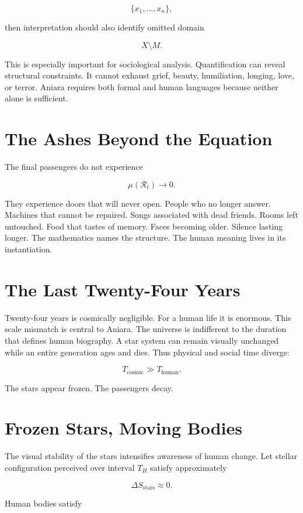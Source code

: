 \documentclass[11pt,oneside]{book}
\theoremstyle{definition}
\theoremstyle{remark}
\newcommand{\R}{\mathcal{R}}
\begin{document}
\[
\{x_1,\ldots,x_n\},
\]

then interpretation should also identify omitted domain

\[
X\setminus M.
\]

This is especially important for sociological analysis. Quantification can reveal structural
constraints. It cannot exhaust grief, beauty, humiliation, longing, love, or terror. Aniara requires
both formal and human languages because neither alone is sufficient.

\section{The Ashes Beyond the Equation}

The final passengers do not experience

\[
\mu(\R_t)\rightarrow0.
\]

They experience doors that will never open. People who no longer answer. Machines that cannot be
repaired. Songs associated with dead friends. Rooms left untouched. Food that tastes of memory.
Faces becoming older. Silence lasting longer. The mathematics names the structure. The human meaning
lives in its instantiation.

\section{The Last Twenty-Four Years}

Twenty-four years is cosmically negligible. For a human life it is enormous. This scale mismatch is
central to Aniara. The universe is indifferent to the duration that defines human biography. A star
system can remain visually unchanged while an entire generation ages and dies. Thus physical and
social time diverge:

\[
T_{\mathrm{cosmic}} \gg T_{\mathrm{human}}.
\]

The stars appear frozen. The passengers decay.

\section{Frozen Stars, Moving Bodies}

The visual stability of the stars intensifies awareness of human change. Let stellar configuration
perceived over interval \(T_H\) satisfy approximately

\[
\Delta S_{\mathrm{stars}}\approx0.
\]

Human bodies satisfy
\end{document}
